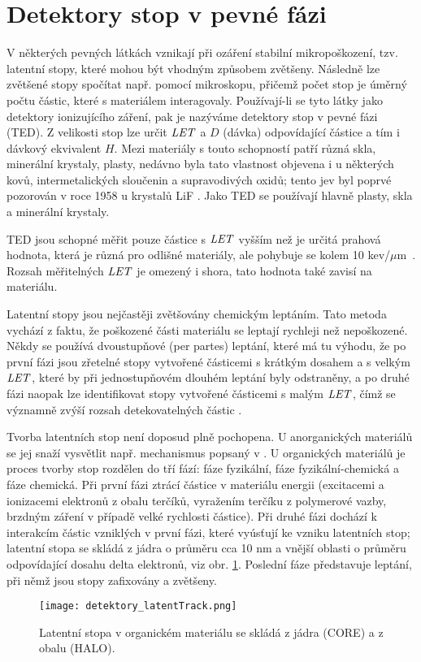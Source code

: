 \section{Detektory stop v pevné fázi}
V některých pevných látkách vznikají při ozáření stabilní mikropoškození, tzv. latentní stopy, které mohou být vhodným způsobem zvětšeny. Následně lze zvětšené stopy spočítat např. pomocí mikroskopu, přičemž počet stop je úměrný počtu částic, které s materiálem interagovaly. Používají-li se tyto látky jako detektory ionizujícího záření, pak je nazýváme detektory stop v pevné fázi (TED). Z velikosti stop lze určit $\mathit{LET}$ a $D$ (dávka) odpovídající částice a tím i dávkový ekvivalent $H$. Mezi materiály s touto schopností patří různá skla, minerální krystaly, plasty, nedávno byla tato vlastnost objevena i u některých kovů, intermetalických sloučenin a supravodivých oxidů; tento jev byl poprvé pozorován v roce 1958 u krystalů LiF \cite{objevTED}. Jako TED
se používají hlavně plasty, skla a minerální krystaly.

TED jsou schopné měřit pouze částice s $\mathit{LET}$ vyšším než je určitá prahová hodnota, která je různá pro odlišné materiály, ale pohybuje se kolem 10 kev/$\mu$m~\cite{ambrozova_dvaExperimenty}. Rozsah měřitelných $\mathit{LET}$ je omezený i shora, tato hodnota také zavisí na materiálu.  

Latentní stopy jsou nejčastěji zvětšovány chemickým leptáním. Tato metoda vychází z faktu, že poškozené části materiálu se leptají rychleji než nepoškozené. Někdy se používá dvoustupňové (per partes) leptání, které má tu výhodu, že po první fázi jsou zřetelné stopy vytvořené částicemi s krátkým dosahem a s velkým $\mathit{LET}$, které by při jednostupňovém dlouhém leptání byly odstraněny, a po druhé fázi naopak lze identifikovat stopy vytvořené částicemi s malým $\mathit{LET}$, čímž se významně zvýší rozsah detekovatelných částic \cite{cesky}. 

Tvorba latentních stop není doposud plně pochopena. U anorganických materiálů se jej snaží vysvětlit např. mechanismus popsaný v \cite{spikeModel}. U organických materiálů je proces tvorby stop rozdělen do tří fází: fáze fyzikální, fáze fyzikální-chemická a fáze chemická. Při první fázi ztrácí částice v materiálu energii (excitacemi a ionizacemi elektronů z obalu terčíků, vyražením terčíku z polymerové vazby, brzdným záření v případě velké rychlosti částice). Při druhé fázi dochází k interakcím částic vzniklých v první fázi, které vyúsťují ke vzniku latentních stop; latentní stopa se skládá z jádra o průměru cca 10 nm a vnější oblasti o průměru odpovídající dosahu delta elektronů, viz obr. \ref{fig:detektory_latentTrack}. Poslední fáze představuje leptání, při němž jsou stopy zafixovány
a zvětšeny.~\cite{thesisKPBrabcova} 
\begin{figure}[h]
  \centering
  \texttt{[image: detektory\_latentTrack.png]}
  \caption{Latentní stopa v organickém materiálu se skládá z jádra (CORE) a z obalu (HALO). \cite{thesisKPBrabcova}}
  \label{fig:detektory_latentTrack}
\end{figure}

